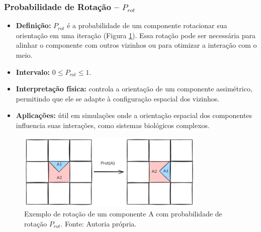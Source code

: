 \documentclass[12pt,oneside]{report}
\begin{document}
\subsubsection{Probabilidade de Rotação – \texorpdfstring{$P_{rot}$}{Prot}}
\label{subsubsec:Prot}

\begin{itemize}
    \item \textbf{Definição:} $P_{rot}$ é a probabilidade de um componente rotacionar sua orientação em uma iteração (Figura \ref{fig:rotacao}). Essa rotação pode ser necessária para alinhar o componente com outros vizinhos ou para otimizar a interação com o meio.
    \item \textbf{Intervalo:} $0 \le P_{rot} \le 1$.
    \item \textbf{Interpretação física:} controla a orientação de um componente assimétrico, permitindo que ele se adapte à configuração espacial dos vizinhos.
    \item \textbf{Aplicações:} útil em simulações onde a orientação espacial dos componentes influencia suas interações, como sistemas biológicos complexos.
\end{itemize}

\begin{figure}[H]
    \centering
    \includegraphics[width=0.8\textwidth]{img/rotacao.png}
    \caption{\small Exemplo de rotação de um componente A com probabilidade de rotação $P_{rot}$. Fonte: Autoria própria.}
    \label{fig:rotacao}
\end{figure}
\end{document}
